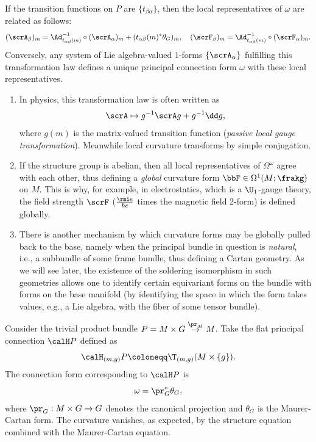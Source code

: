 \begin{cor}[{{\cite[Cor.~1.3.12]{RS2}}}]\label{cor 1.3.12 RS2}
    If the transition functions on $P$ are $\{t_{\beta\alpha}\}$, then the local representatives of $\omega$ are related as follows:
    \[(\scrA_\beta)_m=\Ad_{t_{\alpha\beta}(m)}^{-1}\circ (\scrA_\alpha)_m+(t_{\alpha\beta}(m)^\ast\theta_G)_m,\quad (\scrF_\beta)_m=\Ad_{t_{\alpha\beta}(m)}^{-1}\circ (\scrF_\alpha)_m.\label{eq 1.3.15 RS2}\]
    Conversely, any system of Lie algebra-valued $1$-forms $\{\scrA_\alpha\}$ fulfilling this transformation law defines a unique principal connection form $\omega$ with these local representatives.
\end{cor}

\begin{rem}
    \begin{enumerate}
        \item     In physics, this transformation law is often written as 
        \[\scrA\mapsto g^{-1}\scrA g+g^{-1}\dd g,\]
        where $g(m)$ is the matrix-valued transition function (\emph{passive local gauge transformation}). Meanwhile local curvature transforms by simple conjugation.     
        \item If the structure group is abelian, then all local representatives of $\Omega^\omega$ agree with each other, thus defining a \emph{global} curvature form $\bbF\in\Omega^1(M;\frakg)$ on $M$. This is why, for example, in electrostatics, which is a $\U_1$-gauge theory, the field strength $\scrF$ ($\frac{\rmi e}{\hbar c}$ times the magnetic field 2-form) is defined globally.
        \item There is another mechanism by which curvature forms may be globally pulled back to the base, namely when the principal bundle in question is \emph{natural}, i.e., a subbundle of some frame bundle, thus defining a Cartan geometry. As we will see later, the existence of the soldering isomorphism in such geometries allows one to identify certain equivariant forms on the bundle with forms on the base manifold (by identifying the space in which the form takes values, e.g., a Lie algebra, with the fiber of some tensor bundle).
    \end{enumerate}
\end{rem}
 



\begin{example}\label{ex 1.3.18 RS2}
    Consider the trivial product bundle $P=M\times G\overset{\pr_M}{\to}M$. Take the flat principal connection $\calH P$ defined as 
    \[\calH_{(m,g)}P\coloneqq \T_{(m,g)}(M\times \{g\}).\]
    The connection form corresponding to $\calH P$ is
    \[\omega=\pr_G^\ast \theta_G,\]
    where $\pr_G:M\times G\to G$ denotes the canonical projection and $\theta_G$ is the Maurer-Cartan form. The curvature vanishes, as expected, by the structure equation combined with the Maurer-Cartan equation.
\end{example}

